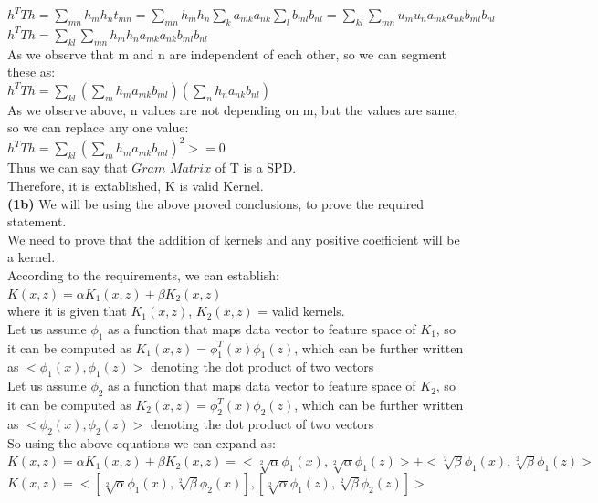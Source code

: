 \documentclass[11pt]{article}
\renewcommand\part[1]{\vspace{.10in}\textbf{(#1)}}
\begin{document}
    $h^TTh = \sum_{mn} h_m h_n t_{mn} = \sum_{mn} h_m h_n \sum_{k} a_{mk}a_{nk} \sum_{l} b_{ml}b_{nl} =\sum_{kl} \sum_{mn} u_m u_n a_{mk}a_{nk} b_{ml}b_{nl}$\\ 
    $h^TTh = \sum_{kl} \sum_{mn} h_m h_n a_{mk} a_{nk} b_{ml} b_{nl}$\\

As we observe that m and n are independent of each other, so we can segment these as:\\

    $h^TTh = \sum_{kl} ( \sum_{m} h_m a_{mk} b_{ml}) (\sum_{n} h_n a_{nk} b_{nl})$\\
As we observe above, n values are not depending on m, but the values are same, so we can replace any one value:\\    
    $h^TTh = \sum_{kl} ( \sum_{m} h_m a_{mk} b_{ml})^2 >= 0$\\
    Thus we can say that $Gram$ $Matrix$ of T is a SPD.\\
Therefore, it is extablished, K is valid Kernel.\\

\part{1b} 
We will be using the above proved conclusions, to prove the required statement.\\
We need to prove that the addition of kernels and any positive coefficient will be a kernel.\\
According to the requirements, we can establish: \\
$K(x,z) = \alpha K_1(x,z) + \beta K_2(x,z)$\\
where it is given that $K_1(x,z)$, $K_2(x,z)$ = valid kernels.\\
Let us assume $\phi_1$ as a function that maps data vector to feature space of $K_1$, so it can be computed as $K_1(x,z) = \phi_1^T(x)\phi_1(z)$, which can be further written as $<\phi_{1}(x),\phi_{1}(z)>$ denoting the dot product of two vectors\\
Let us assume $\phi_2$ as a function that maps data vector to feature space of $K_2$, so it can be computed as $K_2(x,z) = \phi_2^T(x)\phi_2(z)$, which can be further written as $<\phi_{2}(x),\phi_{2}(z)>$ denoting the dot product of two vectors\\
So using the above equations we can expand as:\\

    $K(x,z) = \alpha K_1(x,z) + \beta K_2(x,z) = <\sqrt[2]{\alpha}\phi_1(x), \sqrt[2]{\alpha}\phi_1(z)> + <\sqrt[2]{\beta}\phi_1(x), \sqrt[2]{\beta}\phi_1(z)>$\\
    $K(x,z) = <[\sqrt[2]{\alpha}\phi_1(x), \sqrt[2]{\beta}\phi_2(x)], [\sqrt[2]{\alpha}\phi_1(z), \sqrt[2]{\beta}\phi_2(z)]>$\\
\end{document}
